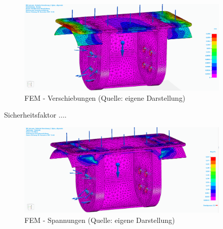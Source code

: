 \begin{figure}[!h]  %
	\centering\includegraphics[width=0.9\textwidth]{images/FEM3.png}
	\caption{FEM - Verschiebungen \newline (Quelle: eigene Darstellung)}
	\label{FEM3} %
\end{figure}
\pagebreak
Sicherheitsfaktor ....

\begin{figure}[!h]  %
	\centering\includegraphics[width=0.9\textwidth]{images/FEM4.png}
	\caption{FEM - Spannungen \newline (Quelle: eigene Darstellung)}
	\label{FEM4} %
\end{figure}
\pagebreak

